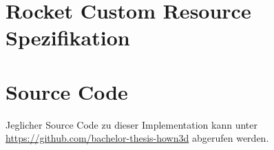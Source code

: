 \chapter{Rocket Custom Resource Spezifikation}
\label{chap:rocketchat_crd_spec}


\chapter{Source Code}
Jeglicher Source Code zu dieser Implementation kann unter \url{https://github.com/bachelor-thesis-hown3d} abgerufen werden.